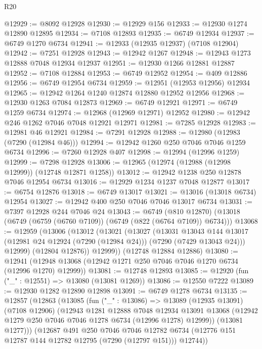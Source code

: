 \begin{lexlean}{R20}
\begin{coremodule}
{@12929 := @8092 @12928
@12930 := @12929 @156
@12933 := @12930 @1274 @12890 @12895
@12934 := @7108 @12893
@12935 := @6749 @12934
@12937 := @6749 @1270 @6734
@12941 := @12933 (@12935 @12937) (@7108 @12904)
@12942 := @7251 @12928
@12943 := @12942 @1267
@12948 := @12943 @1273 @12888 @7048 @12934 @12937
@12951 := @12930 @1266 @12881 @12887
@12952 := @7108 @12884
@12953 := @6749 @12952
@12954 := @409 @12886
@12956 := @6749 @12954 @6734
@12959 := @12951 (@12953 @12956) @12934
@12965 := @12942 @1264 @1240 @12874 @12880 @12952 @12956
@12968 := @12930 @1263 @7084 @12873
@12969 := @6749 @12921
@12971 := @6749 @1259 @6734
@12974 := @12968 (@12969 @12971) @12952
@12980 := @12942 @246 @1262 @7046 @7048 @12921 @12971
@12981 := @7285 @12928
@12983 := @12981 @46 @12921
@12984 := @7291 @12928
@12988 := @12980 (@12983 (@7290 (@12984 @46)))
@12994 := @12942 @1260 @250 @7046 @7046 @1259 @6734
@12996 := @7260 @12928 @407
@12998 := @12994 (@12996 @1259)
@12999 := @7298 @12928
@13006 := @12965 (@12974 (@12988 (@12998 @12999)) (@12748 @12871 @1258))
@13012 := @12942 @1238 @250 @12878 @7046 @12954 @6734
@13016 := @12929 @1234 @1237 @7048 @12877
@13017 := @6754 @12876
@13018 := @6749 @13017
@13021 := @13016 (@13018 @6734) @12954
@13027 := @12942 @400 @250 @7046 @7046 @13017 @6734
@13031 := @7397 @12928 @244 @7046 @24
@13043 := @6749
    (@810 @12870)
    (@13018 (@6749 (@6759 (@6760 @7109)) (@6749 (@822 (@6764 @7109)) @6734)))
@13068 := @12959
    (@13006
      (@13012
        (@13021
          (@13027
            (@13031
              @13043
              @144
              @13017
              (@12981 @24 @12924 (@7290 (@12984 @24)))
              (@7290 (@7429 @13043 @24)))
            @12999)
          (@12804 @12876))
        @12999))
    (@12748 @12884 @12886)
@13080 := @12941 (@12948 @13068 (@12942 @1271 @250 @7046 @7046 @1270 @6734 (@12996 @1270) @12999))
@13081 := @12748 @12893
@13085 := @12920 (fun ("_" : @12551) => @13080 (@13081 @1269))
@13086 := @12550 @7222
@13089 := @12930 @1282 @12890 @12898
@13091 := @6749 @1278 @6734
@13135 := @12857
    (@12863
      (@13085
        (fun ("_" : @13086) =>
        @13089
          (@12935 @13091)
          (@7108 @12906)
          (@12943
            @1281
            @12888
            @7048
            @12934
            @13091
            @13068
            (@12942 @1279 @250 @7046 @7046 @1278 @6734 (@12996 @1278) @12999))
          (@13081 @1277)))
      (@12687
        @491
        @250
        @7046
        @7046
        @12782
        @6734
        (@12776 @151 @12787 @144 @12782 @12795 (@7290 (@12797 @151)))
        @12744))
}
\end{coremodule}
\end{lexlean}
